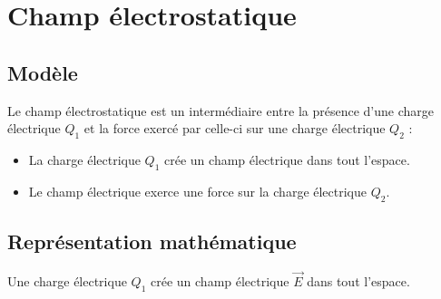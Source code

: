 
\section{Champ électrostatique}
%
\subsection{Modèle}
Le champ électrostatique est un intermédiaire entre la présence d'une charge électrique $Q_1$ et la force exercé par celle-ci sur une charge électrique $Q_2$ :


\begin{itemize}[leftmargin=2.3cm, label=, itemsep=5pt]
\item La charge électrique $Q_1$ crée un champ électrique dans tout l'espace.
\item Le champ électrique exerce une force sur la charge électrique $Q_2$.
\end{itemize}

\subsection{Représentation mathématique}
Une charge électrique $Q_1$ crée un champ électrique $\overrightarrow{E}$ dans tout l'espace. 

